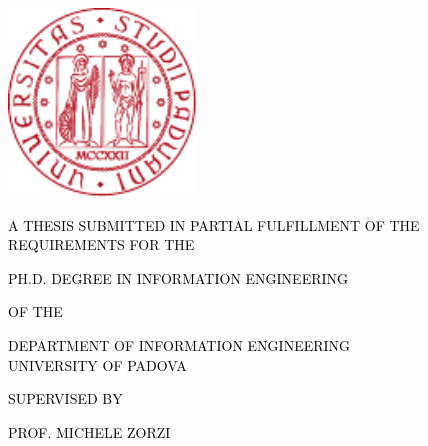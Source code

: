 \begin{titlepage}
  \makeatletter

  {
    \sffamily%
    \fontsize{20}{24}\selectfont\par\noindent\textcolor{black}{\MakeUppercase{\@author}}%
    \vspace*{1cm}%
    \fontsize{24}{46}\selectfont\par\noindent{\MakeUppercase{\@title}}%
  }

  \vspace{1.5cm}
  {
    \begin{center}
      \includegraphics[width=5cm]{Figures/unipd_logo_only.pdf}
    \end{center}
  }

  \vspace{1.5cm}
  {
    \sffamily%
    \fontsize{8}{15}\selectfont\par\noindent\textcolor{black}
    {\MakeUppercase{A thesis submitted in partial fulfillment of the requirements for the}}
    \vspace{0.1cm}%
    \fontsize{12}{15}\selectfont\par\noindent\textcolor{black}
    {\MakeUppercase{Ph.D. Degree in Information Engineering}}
    \vspace{0.1cm}%
    \fontsize{8}{15}\selectfont\par\noindent\textcolor{black}
    {\MakeUppercase{of the}}
    \vspace{0.1cm}
    \fontsize{12}{15}\selectfont\par\noindent\textcolor{black}
    {\MakeUppercase{Department of Information Engineering\\University of Padova}}%
    \vspace{0.1cm}%
    \fontsize{8}{15}\selectfont\par\noindent\textcolor{black}
    {\MakeUppercase{supervised by}}
    \vspace{0.1cm}%
    \fontsize{12}{15}\selectfont\par\noindent\textcolor{black}
    {\MakeUppercase{prof. Michele Zorzi}}%
  }


\end{titlepage}
